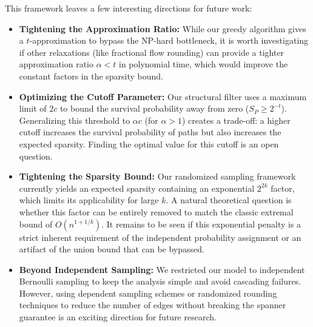 \documentclass[11pt,a4paper]{article}
\begin{document}
This framework leaves a few interesting directions for future work:

\begin{itemize}
    \item \textbf{Tightening the Approximation Ratio:} While our greedy algorithm gives a $t$-approximation to bypass the NP-hard bottleneck, it is worth investigating if other relaxations (like fractional flow rounding) can provide a tighter approximation ratio $\alpha < t$ in polynomial time, which would improve the constant factors in the sparsity bound.
    
    \item \textbf{Optimizing the Cutoff Parameter:} Our structural filter uses a maximum limit of $2c$ to bound the survival probability away from zero ($S_P \ge 2^{-t}$). Generalizing this threshold to $\alpha c$ (for $\alpha > 1$) creates a trade-off: a higher cutoff increases the survival probability of paths but also increases the expected sparsity. Finding the optimal value for this cutoff is an open question.
    
    \item \textbf{Tightening the Sparsity Bound:} Our randomized sampling framework currently yields an expected sparsity containing an exponential $2^{2k}$ factor, which limits its applicability for large $k$. A natural theoretical question is whether this factor can be entirely removed to match the classic extremal bound of $O(n^{1+1/k})$. It remains to be seen if this exponential penalty is a strict inherent requirement of the independent probability assignment or an artifact of the union bound that can be bypassed.
    
    \item \textbf{Beyond Independent Sampling:} We restricted our model to independent Bernoulli sampling to keep the analysis simple and avoid cascading failures. However, using dependent sampling schemes or randomized rounding techniques to reduce the number of edges without breaking the spanner guarantee is an exciting direction for future research.
\end{itemize}
\end{document}
